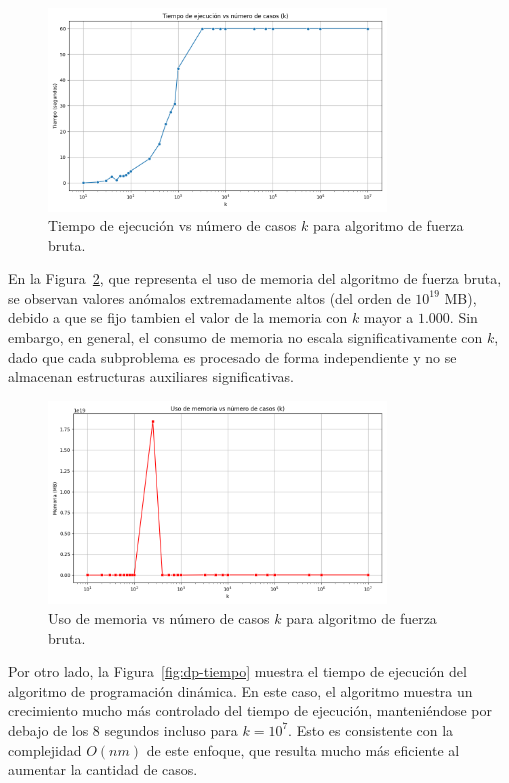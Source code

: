 \begin{figure}[H]
    \centering
    \includegraphics[width=0.8\textwidth]{../code/brute_force/data/plots/tiempo_vs_k.png}
    \caption{Tiempo de ejecución vs número de casos $k$ para algoritmo de fuerza bruta.}
    \label{fig:bf-tiempo}
\end{figure}

En la Figura~\ref{fig:bf-memoria}, que representa el uso de memoria del algoritmo de fuerza bruta, se observan valores anómalos extremadamente altos (del orden de $10^{19}$ MB), debido a que se fijo tambien el valor de la memoria con $k$ mayor a $1.000$. Sin embargo, en general, el consumo de memoria no escala significativamente con $k$, dado que cada subproblema es procesado de forma independiente y no se almacenan estructuras auxiliares significativas.

\begin{figure}[H]
    \centering
    \includegraphics[width=0.8\textwidth]{../code/brute_force/data/plots/memoria_vs_k.png}
    \caption{Uso de memoria vs número de casos $k$ para algoritmo de fuerza bruta.}
    \label{fig:bf-memoria}
\end{figure}

Por otro lado, la Figura~\ref{fig:dp-tiempo} muestra el tiempo de ejecución del algoritmo de programación dinámica. En este caso, el algoritmo muestra un crecimiento mucho más controlado del tiempo de ejecución, manteniéndose por debajo de los 8 segundos incluso para $k = 10^7$. Esto es consistente con la complejidad $O(nm)$ de este enfoque, que resulta mucho más eficiente al aumentar la cantidad de casos.

